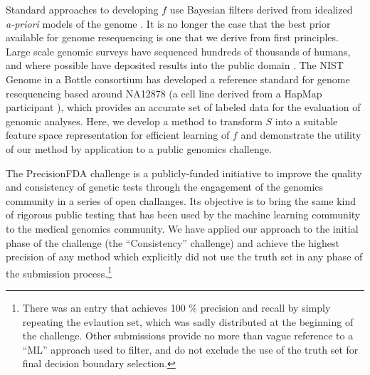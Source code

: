 \documentclass{article}
\begin{document}
Standard approaches to developing $f$ use Bayesian filters derived from idealized \emph{a-priori} models of the genome  \cite{samtools, gatk2011, garrison2012haplotype, rimmer2014integrating, li2011stats}.
It is no longer the case that the best prior available for genome resequencing is one that we derive from first principles. 
Large scale genomic surveys have sequenced hundreds of thousands of humans, and where possible have deposited results into the public domain \cite{1000Gphase1, 1000g2015, exac2015, cavalli2005human, uk10k2015uk10k}.
The NIST Genome in a Bottle consortium \cite{zook2014integrating} has developed a reference standard for genome resequencing based around NA12878 (a cell line derived from a HapMap participant \cite{gibbs2003international}), which provides an accurate set of labeled data for the evaluation of genomic analyses.
Here, we develop a method to transform $S$ into a suitable feature space representation for efficient learning of $f$ and demonstrate the utility of our method by application to a public genomics challenge.



The PrecisionFDA challenge is a publicly-funded initiative to improve the quality and consistency of genetic tests through the engagement of the genomics community in a series of open challanges.
Its objective is to bring the same kind of rigorous public testing that has been used by the machine learning community to the medical genomics community.
We have applied our approach to the initial phase of the challenge (the ``Consistency'' challenge) and achieve the highest precision of any method which explicitly did not use the truth set in any phase of the submission process.\footnote{There was an entry that achieves 100 \% precision and recall by simply repeating the evlaution set, which was sadly distributed at the beginning of the challenge. Other submissions provide no more than vague reference to a ``ML'' approach used to filter, and do not exclude the use of the truth set for final decision boundary selection.}
\end{document}
